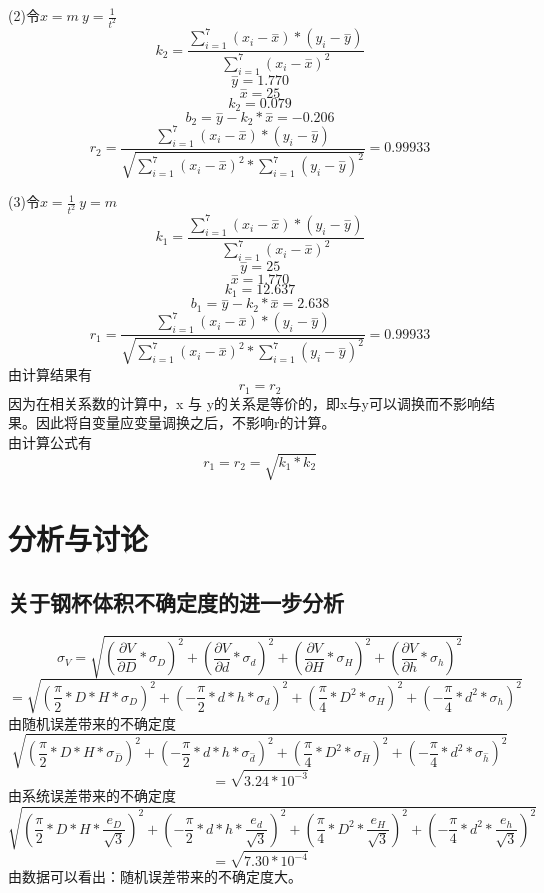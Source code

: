 \documentclass[a4paper,11pt]{article}
\begin{document}
(2)令$ x=m \ y=\frac{1}{t^{2}} $
$$ k_{2} = \dfrac{\sum _{i=1}^{7}(x_{i} - \stackrel{-}{x})*(y_{i} - \stackrel{-}{y})}{\sum _{i=1}^{7}(x_{i} - \stackrel{-}{x})^{2}} $$
$$ \stackrel{-}{y} = 1.770 $$
$$ \stackrel{-}{x} = 25 $$
$$ k_{2} = 0.079 $$
$$ b_{2} = \stackrel{-}{y} - k_{2}*\stackrel{-}{x} = -0.206 $$
$$ r_{2} = \dfrac{\sum _{i=1}^{7}(x_{i} - \stackrel{-}{x})*(y_{i} - \stackrel{-}{y})}{\sqrt{\sum _{i=1}^{7}(x_{i} - \stackrel{-}{x})^{2} * \sum _{i=1}^{7}(y_{i} - \stackrel{-}{y})^{2}}} = 0.99933 $$

(3)令$ x=\frac{1}{t^{2}} \ y=m $
$$ k_{1} = \dfrac{\sum _{i=1}^{7}(x_{i} - \stackrel{-}{x})*(y_{i} - \stackrel{-}{y})}{\sum _{i=1}^{7}(x_{i} - \stackrel{-}{x})^{2}} $$
$$ \stackrel{-}{y} = 25 $$
$$ \stackrel{-}{x} = 1.770 $$
$$ k_{1} = 12.637 $$
$$ b_{1} = \stackrel{-}{y} - k_{2}*\stackrel{-}{x} = 2.638 $$
$$ r_{1} = \dfrac{\sum _{i=1}^{7}(x_{i} - \stackrel{-}{x})*(y_{i} - \stackrel{-}{y})}{\sqrt{\sum _{i=1}^{7}(x_{i} - \stackrel{-}{x})^{2} * \sum _{i=1}^{7}(y_{i} - \stackrel{-}{y})^{2}}} = 0.99933 $$
由计算结果有
$$r_{1}=r_{2}$$
因为在相关系数的计算中，x 与 y的关系是等价的，即x与y可以调换而不影响结果。因此将自变量应变量调换之后，不影响r的计算。\\
由计算公式有
$$r_{1}=r_{2}= \sqrt{k_{1}*k_{2}}$$



\section{分析与讨论}
\subsection{关于钢杯体积不确定度的进一步分析}
$$ \sigma_{V} = \sqrt{(\dfrac{\partial V}{\partial D} * \sigma_{D})^{2} + (\dfrac{\partial V}{\partial d} * \sigma_{d})^{2} + (\dfrac{\partial V}{\partial H} * \sigma_{H})^{2} + (\dfrac{\partial V}{\partial h} * \sigma_{h})^{2} } $$
$$ = \sqrt{(\dfrac{\pi}{2} * D * H *\sigma_{D} )^{2} + (- \dfrac{\pi}{2} * d * h *\sigma_{d} )^{2} + (\dfrac{\pi}{4} * D^{2}*\sigma_{H} )^{2} + (- \dfrac{\pi}{4} *  d^{2} *\sigma_{h} )^{2}} $$
由随机误差带来的不确定度
$$ \sqrt{(\dfrac{\pi}{2} * D * H *\sigma_{\stackrel{-}{D}} )^{2}  + (- \dfrac{\pi}{2} * d * h *\sigma_{\stackrel{-}{d}} )^{2} + (\dfrac{\pi}{4} * D^{2} *\sigma_{\stackrel{-}{H}} )^{2}  + (- \dfrac{\pi}{4} *  d^{2} *\sigma_{\stackrel{-}{h}} )^{2} }  $$
$$ = \sqrt{3.24*10^{-3}}  $$
由系统误差带来的不确定度
$$ \sqrt{(\dfrac{\pi}{2} * D * H *\frac{e_{D}}{\sqrt{3}} )^{2} + (- \dfrac{\pi}{2} * d * h *\frac{e_{d}}{\sqrt{3}} )^{2} + (\dfrac{\pi}{4} * D^{2}*\frac{e_{H}}{\sqrt{3}} )^{2} + (- \dfrac{\pi}{4} *  d^{2} *\frac{e_{h}}{\sqrt{3}} )^{2}}  $$
$$= \sqrt{7.30*10^{-4}}$$
由数据可以看出：随机误差带来的不确定度大。
	
\end{document}
